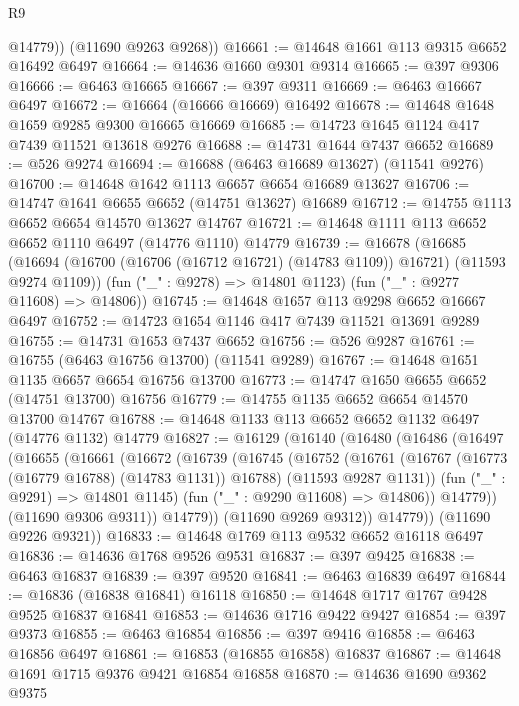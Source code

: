 \begin{lexlean}{R9}
\begin{coremodule}
{{{{{{{{{{{{{{{{{{{{{{{{{{{{{{{{{{{{{{{{{{{{{{{{{{{{{{{{{{{{{{{{{{{{{{{{{{{{{{{{{{{{          @14779))
      (@11690 @9263 @9268))
@16661 := @14648 @1661 @113 @9315 @6652 @16492 @6497
@16664 := @14636 @1660 @9301 @9314
@16665 := @397 @9306
@16666 := @6463 @16665
@16667 := @397 @9311
@16669 := @6463 @16667 @6497
@16672 := @16664 (@16666 @16669) @16492
@16678 := @14648 @1648 @1659 @9285 @9300 @16665 @16669
@16685 := @14723 @1645 @1124 @417 @7439 @11521 @13618 @9276
@16688 := @14731 @1644 @7437 @6652
@16689 := @526 @9274
@16694 := @16688 (@6463 @16689 @13627) (@11541 @9276)
@16700 := @14648 @1642 @1113 @6657 @6654 @16689 @13627
@16706 := @14747 @1641 @6655 @6652 (@14751 @13627) @16689
@16712 := @14755 @1113 @6652 @6654 @14570 @13627 @14767
@16721 := @14648 @1111 @113 @6652 @6652 @1110 @6497 (@14776 @1110) @14779
@16739 := @16678
    (@16685
      (@16694 (@16700 (@16706 (@16712 @16721) (@14783 @1109)) @16721) (@11593 @9274 @1109))
      (fun ("_" : @9278) => @14801 @1123)
      (fun ("_" : @9277 @11608) => @14806))
@16745 := @14648 @1657 @113 @9298 @6652 @16667 @6497
@16752 := @14723 @1654 @1146 @417 @7439 @11521 @13691 @9289
@16755 := @14731 @1653 @7437 @6652
@16756 := @526 @9287
@16761 := @16755 (@6463 @16756 @13700) (@11541 @9289)
@16767 := @14648 @1651 @1135 @6657 @6654 @16756 @13700
@16773 := @14747 @1650 @6655 @6652 (@14751 @13700) @16756
@16779 := @14755 @1135 @6652 @6654 @14570 @13700 @14767
@16788 := @14648 @1133 @113 @6652 @6652 @1132 @6497 (@14776 @1132) @14779
@16827 := @16129
    (@16140
      (@16480
        (@16486
          (@16497
            (@16655
              (@16661
                (@16672
                  (@16739
                    (@16745
                      (@16752
                        (@16761
                          (@16767 (@16773 (@16779 @16788) (@14783 @1131)) @16788)
                          (@11593 @9287 @1131))
                        (fun ("_" : @9291) => @14801 @1145)
                        (fun ("_" : @9290 @11608) => @14806))
                      @14779))
                  (@11690 @9306 @9311))
                @14779))
            (@11690 @9269 @9312))
          @14779))
      (@11690 @9226 @9321))
@16833 := @14648 @1769 @113 @9532 @6652 @16118 @6497
@16836 := @14636 @1768 @9526 @9531
@16837 := @397 @9425
@16838 := @6463 @16837
@16839 := @397 @9520
@16841 := @6463 @16839 @6497
@16844 := @16836 (@16838 @16841) @16118
@16850 := @14648 @1717 @1767 @9428 @9525 @16837 @16841
@16853 := @14636 @1716 @9422 @9427
@16854 := @397 @9373
@16855 := @6463 @16854
@16856 := @397 @9416
@16858 := @6463 @16856 @6497
@16861 := @16853 (@16855 @16858) @16837
@16867 := @14648 @1691 @1715 @9376 @9421 @16854 @16858
@16870 := @14636 @1690 @9362 @9375
}}}}}}}}}}}}}}}}}}}}}}}}}}}}}}}}}}}}}}}}}}}}}}}}}}}}}}}}}}}}}}}}}}}}}}}}}}}}}}}}}}}}
\end{coremodule}
\end{lexlean}

